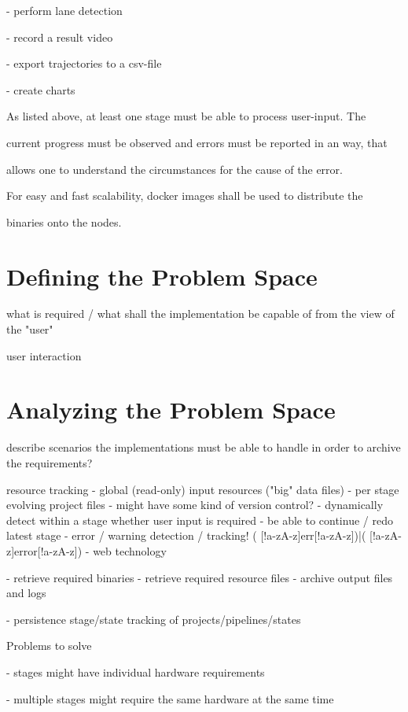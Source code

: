 - perform lane detection

- record a result video

- export trajectories to a csv-file

- create charts



As listed above, at least one stage must be able to process user-input. The

current progress must be observed and errors must be reported in an way, that

allows one to understand the circumstances for the cause of the error.

For easy and fast scalability, docker images shall be used to distribute the

binaries onto the nodes.


\section{Defining the Problem Space}

what is required / what shall the implementation be capable of from the view of the "user"

user interaction



\section{Analyzing the Problem Space}

describe scenarios the implementations must be able to handle in order to archive the requirements?

resource tracking
 - global (read-only) input resources ("big" data files)
 - per stage evolving project files
   - might have some kind of version control?
 - dynamically detect within a stage whether user input is required
 - be able to continue / redo latest stage
 - error / warning detection / tracking!
   ( [!a-zA-z]err[!a-zA-z])|( [!a-zA-z]error[!a-zA-z])
 - web technology

- retrieve required binaries
- retrieve required resource files
- archive output files and logs

- persistence stage/state tracking of projects/pipelines/states

Problems to solve



- stages might have individual hardware requirements

- multiple stages might require the same hardware at the same time

